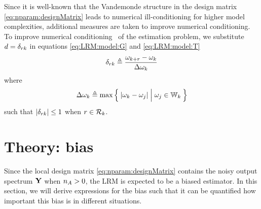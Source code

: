 

Since it is well-known that the Vandemonde structure in the design matrix \eqref{eq:nparam:designMatrix} leads to numerical ill-conditioning for higher model complexities, additional measures are taken to improve numerical conditioning.
To improve numerical conditioning~\citep{Pintelon2005} of the estimation problem, we substitute $d = \delta_{rk}$ in equations \eqref{eq:LRM:model:G} and \eqref{eq:LRM:model:T}
\begin{equation}
\delta_{rk} \triangleq \frac{\omega_{k+r} - \omega_k}{\Delta \omega_k}
\label{eq:freqScaling}
\end{equation}
where
\begin{equation}
  \Delta \omega_k \isdef
  \max
  \Set{
    \abs{ \omega_k - \omega_j} |  \vphantom{\frac{a}{b}}  \omega_j \in \LocalWindow[k]
  }
\end{equation}
such that $\left| \delta_{rk} \right| \leq 1$ when $r \in \mathcal{R}_{k}$.


\section{Theory: bias}
\label{sec:biascalc}
Since the local design matrix \eqref{eq:nparam:designMatrix} contains the noisy output spectrum $\mathbf{Y}$ when $n_{A} > 0$, the \gls{LRM} is expected to be a biased estimator.
In this section, we will derive expressions for the bias such that it can be quantified how important this bias is in different situations.

